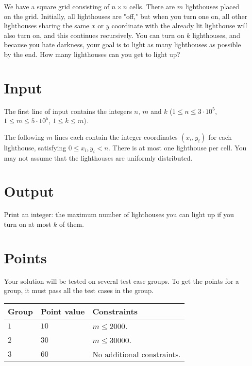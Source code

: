 \noindent

We have a square grid consisting of $n \times n$ cells. There are $m$ lighthouses placed on the grid.
Initially, all lighthouses are "off," but when you turn one on, all other lighthouses sharing the same
$x$ or $y$ coordinate with the already lit lighthouse will also turn on, and this continues recursively.
You can turn on $k$ lighthouses, and because you hate darkness, your goal is to light as many lighthouses
as possible by the end. How many lighthouses can you get to light up?

\section*{Input}
The first line of input contains the integers $n$, $m$ and $k$ ($1 \leq n \leq 3 \cdot 10^5$, $1 \leq m \leq 5 \cdot 10^5$, $1 \leq k \leq m$).

The following $m$ lines each contain the integer coordinates $(x_i, y_i)$ for each lighthouse, satisfying $0 \le x_i, y_i < n$.
There is at most one lighthouse per cell. You may not assume that the lighthouses are uniformly distributed.

\section*{Output}
Print an integer: the maximum number of lighthouses you can light up if you turn on at most $k$ of them.


\section*{Points}
Your solution will be tested on several test case groups.
To get the points for a group, it must pass all the test cases in the group.

\noindent
\begin{tabular}{| l | l | p{12cm} |}
  \hline
  \textbf{Group} & \textbf{Point value} & \textbf{Constraints} \\ \hline
  $1$    & $10$      & $m \leq 2000$. \\ \hline
  $2$    & $30$      & $m \leq 30000$. \\ \hline
  $3$    & $60$      & No additional constraints. \\ \hline
\end{tabular}
